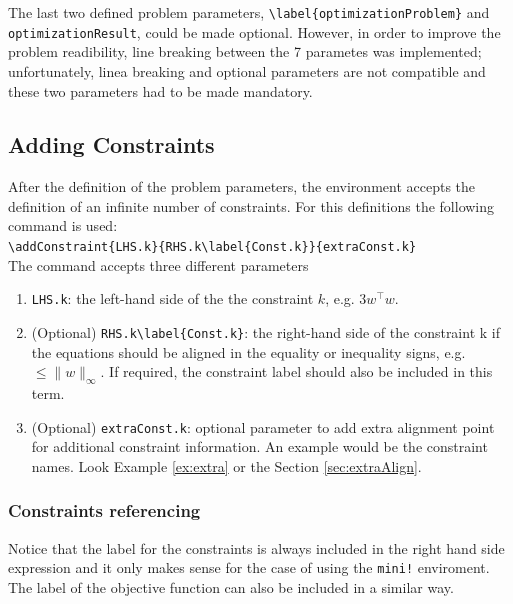 \documentclass[a4paper]{article}
\begin{document}
The last two defined problem parameters,  \verb|\label{optimizationProblem}| and \verb|optimizationResult|, could be made optional. However, in order to improve the problem readibility, line breaking between the 7 parametes was implemented; unfortunately, linea breaking and optional parameters are not compatible and these two parameters had to be made mandatory.

\subsection{Adding Constraints}
\label{subsec:syntax}
After the definition of the problem parameters, the environment accepts the definition of an infinite number of constraints. For this definitions the following command is used:
~\\

\verb|\addConstraint{LHS.k}{RHS.k\label{Const.k}}{extraConst.k}| 
~\\

The command accepts three different parameters
\begin{enumerate}
	\item \verb|LHS.k|: the left-hand side of the the constraint $k$, e.g. $3w^\top w$.
	\item (Optional) \verb|RHS.k\label{Const.k}|: the right-hand side of the constraint k if the equations should be aligned in the equality or inequality signs, e.g. $\leq \|w\|_\infty$. If required, the constraint label should also be included in this term. 
	\item (Optional) \verb|extraConst.k|: optional parameter to add extra alignment point for additional constraint information. An example would be the constraint names. Look Example \ref{ex:extra} or the Section \ref{sec:extraAlign}.
\end{enumerate}

\subsubsection{Constraints referencing}
Notice that the label for the constraints is always included in the right hand side expression and it only makes sense for the case of using the \verb|mini!| enviroment. The label of the objective function can also be included in a similar way.
\end{document}
